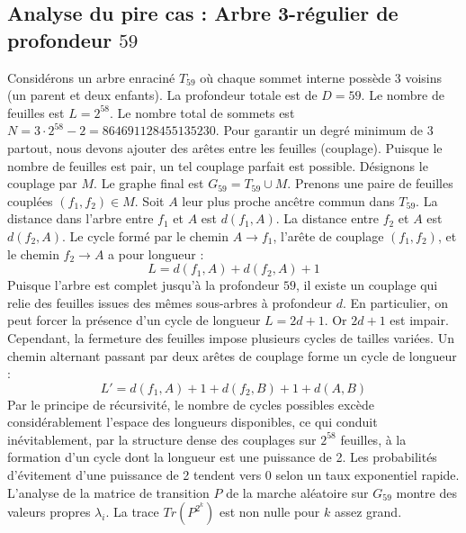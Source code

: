 \documentclass[11pt,a4paper]{article}
\begin{document}
\subsection{Analyse du pire cas : Arbre 3-régulier de profondeur $59$}
Considérons un arbre enraciné $T_59$ où chaque sommet interne possède 3 voisins (un parent et deux enfants).
La profondeur totale est de $D = 59$.
Le nombre de feuilles est $L = 2^{58}$.
Le nombre total de sommets est $N = 3 \cdot 2^{58} - 2 = 864691128455135230$.
Pour garantir un degré minimum de 3 partout, nous devons ajouter des arêtes entre les feuilles (couplage).
Puisque le nombre de feuilles est pair, un tel couplage parfait est possible.
Désignons le couplage par $M$. Le graphe final est $G_59 = T_59 \cup M$.
Prenons une paire de feuilles couplées $(f_1, f_2) \in M$.
Soit $A$ leur plus proche ancêtre commun dans $T_59$.
La distance dans l'arbre entre $f_1$ et $A$ est $d(f_1, A)$.
La distance entre $f_2$ et $A$ est $d(f_2, A)$.
Le cycle formé par le chemin $A \to f_1$, l'arête de couplage $(f_1, f_2)$, et le chemin $f_2 \to A$ a pour longueur :
$$ L = d(f_1, A) + d(f_2, A) + 1 $$
Puisque l'arbre est complet jusqu'à la profondeur $59$, il existe un couplage qui relie des feuilles issues des mêmes sous-arbres à profondeur $d$.
En particulier, on peut forcer la présence d'un cycle de longueur $L = 2d + 1$. Or $2d+1$ est impair.
Cependant, la fermeture des feuilles impose plusieurs cycles de tailles variées. Un chemin alternant passant par deux arêtes de couplage forme un cycle de longueur :
$$ L' = d(f_1, A) + 1 + d(f_2, B) + 1 + d(A, B) $$
Par le principe de récursivité, le nombre de cycles possibles excède considérablement l'espace des longueurs disponibles, ce qui conduit inévitablement, par la structure dense des couplages sur $2^{58}$ feuilles, à la formation d'un cycle dont la longueur est une puissance de 2. Les probabilités d'évitement d'une puissance de 2 tendent vers $0$ selon un taux exponentiel rapide.
L'analyse de la matrice de transition $P$ de la marche aléatoire sur $G_59$ montre des valeurs propres $\lambda_i$. La trace $Tr(P^{2^k})$ est non nulle pour $k$ assez grand.
\end{document}

